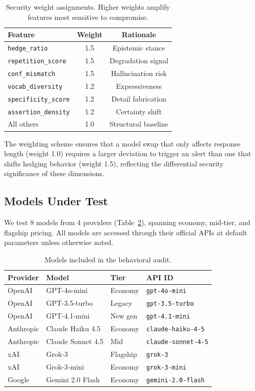 \documentclass[11pt,twocolumn]{article}
\begin{document}
\begin{table}[H]
\centering\small
\caption{Security weight assignments. Higher weights amplify features most sensitive to compromise.}
\label{tab:weights}
\begin{tabular}{lcc}
\toprule
\textbf{Feature} & \textbf{Weight} & \textbf{Rationale} \\
\midrule
\texttt{hedge\_ratio} & 1.5 & Epistemic stance \\
\texttt{repetition\_score} & 1.5 & Degradation signal \\
\texttt{conf\_mismatch} & 1.5 & Hallucination risk \\
\texttt{vocab\_diversity} & 1.2 & Expressiveness \\
\texttt{specificity\_score} & 1.2 & Detail fabrication \\
\texttt{assertion\_density} & 1.2 & Certainty shift \\
All others & 1.0 & Structural baseline \\
\bottomrule
\end{tabular}
\end{table}

The weighting scheme ensures that a model swap that only affects response length (weight 1.0) requires a larger deviation to trigger an alert than one that shifts hedging behavior (weight 1.5), reflecting the differential security significance of these dimensions.

\subsection{Models Under Test}
\label{sec:models}

We test 8 models from 4 providers (Table~\ref{tab:models}), spanning economy, mid-tier, and flagship pricing.
All models are accessed through their official APIs at default parameters unless otherwise noted.

\begin{table}[H]
\centering\small
\caption{Models included in the behavioral audit.}
\label{tab:models}
\begin{tabular}{llll}
\toprule
\textbf{Provider} & \textbf{Model} & \textbf{Tier} & \textbf{API ID} \\
\midrule
OpenAI & GPT-4o-mini & Economy & \texttt{gpt-4o-mini} \\
OpenAI & GPT-3.5-turbo & Legacy & \texttt{gpt-3.5-turbo} \\
OpenAI & GPT-4.1-mini & New gen & \texttt{gpt-4.1-mini} \\
Anthropic & Claude Haiku 4.5 & Economy & \texttt{claude-haiku-4-5} \\
Anthropic & Claude Sonnet 4.5 & Mid & \texttt{claude-sonnet-4-5} \\
xAI & Grok-3 & Flagship & \texttt{grok-3} \\
xAI & Grok-3-mini & Economy & \texttt{grok-3-mini} \\
Google & Gemini 2.0 Flash & Economy & \texttt{gemini-2.0-flash} \\
\bottomrule
\end{tabular}
\end{table}
\end{document}
